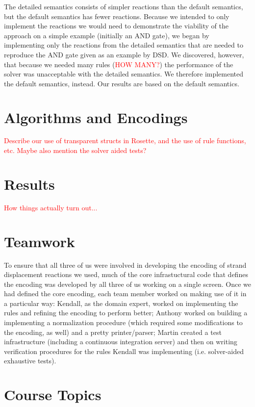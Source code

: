 \documentclass{article}
\begin{document}
The detailed semantics consists of simpler reactions than the default
semantics, but the default semantics has fewer reactions. Because we
intended to only implement the reactions we would need to demonstrate
the viability of the approach on a simple example (initially an
AND gate), we began by implementing only the reactions from the
detailed semantics that are needed to reproduce the AND gate given as
an example by DSD. We discovered, however, that because we needed many
rules (\textcolor{red}{HOW MANY?}) the performance of the solver was
unacceptable with the detailed semantics. We therefore implemented the
default semantics, instead. Our results are based on the default semantics.

\section{Algorithms and Encodings}

\textcolor{red}{Describe our use of transparent structs in Rosette,
  and the use of rule functions, etc. Maybe also mention the solver
  aided tests?}

\section{Results}

\textcolor{red}{How things actually turn out...}

\section{Teamwork}

To ensure that all three of us were involved in developing the encoding of
strand displacement reactions we used, much of the core infrastuctural code
that defines the encoding was developed by all three of us working on a single
screen. Once we had defined the core encoding, each team member worked on
making use of it in a particular way: Kendall, as the domain expert, worked
on implementing the rules and refining the encoding to perform better; Anthony
worked on building a implementing a normalization procedure (which required
some modifications to the encoding, as well) and a pretty printer/parser;
Martin created a test infrastructure (including a continuous integration server)
and then on writing verification procedures for the rules Kendall was
implementing (i.e. solver-aided exhaustive tests).

\section{Course Topics}
\end{document}

